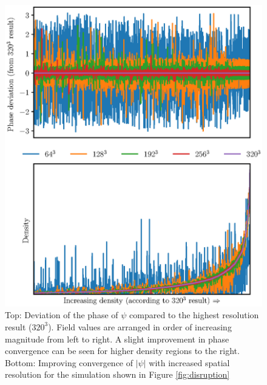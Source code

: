 \documentclass[a4paper,11pt]{article}
\begin{document}
\begin{figure}
  \includegraphics[width=1.\textwidth,trim=0 1cm 0 2cm,clip]{combined2}
  \caption{Top: Deviation of the phase of $\psi$ compared to the highest resolution result ($320^3$). Field values are arranged in order of increasing magnitude from left to right. A slight improvement in phase convergence can be seen for higher density regions to the right. Bottom: Improving convergence of $\vert\psi\vert$ with increased spatial resolution for the simulation shown in Figure \ref{fig:disruption}}
  \label{fig:spatial}
\end{figure}
\end{document}
